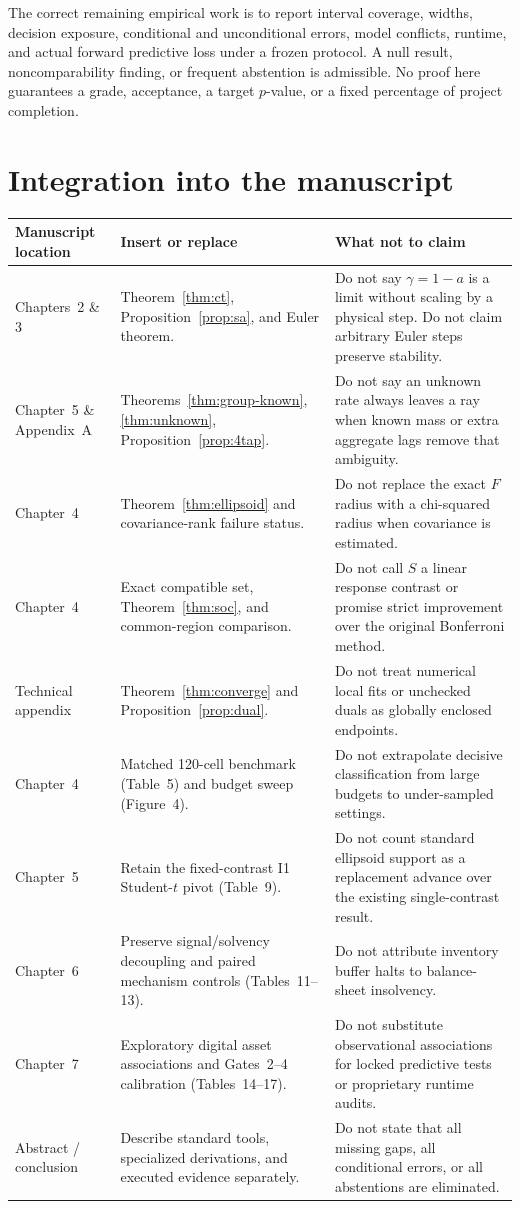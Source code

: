 \documentclass[11pt,a4paper]{article}
\theoremstyle{definition}\newtheorem{definition}[theorem]{Definition}
\theoremstyle{remark}\newtheorem{remark}[theorem]{Remark}
\begin{document}
The correct remaining empirical work is to report interval coverage, widths, decision exposure, conditional and unconditional errors, model conflicts, runtime, and actual forward predictive loss under a frozen protocol. A null result, noncomparability finding, or frequent abstention is admissible. No proof here guarantees a grade, acceptance, a target $p$-value, or a fixed percentage of project completion.

\section{Integration into the manuscript}
\begin{longtable}{P{.20\textwidth}P{.34\textwidth}P{.38\textwidth}}
\toprule
Manuscript location & Insert or replace & What not to claim\\\midrule
Chapters~2 \& 3 & Theorem~\ref{thm:ct}, Proposition~\ref{prop:sa}, and Euler theorem. & Do not say $\gamma=1-a$ is a limit without scaling by a physical step. Do not claim arbitrary Euler steps preserve stability.\\
Chapter~5 \& Appendix~A & Theorems~\ref{thm:group-known}, \ref{thm:unknown}, Proposition~\ref{prop:4tap}. & Do not say an unknown rate always leaves a ray when known mass or extra aggregate lags remove that ambiguity.\\
Chapter~4 & Theorem~\ref{thm:ellipsoid} and covariance-rank failure status. & Do not replace the exact $F$ radius with a chi-squared radius when covariance is estimated.\\
Chapter~4 & Exact compatible set, Theorem~\ref{thm:soc}, and common-region comparison. & Do not call $S$ a linear response contrast or promise strict improvement over the original Bonferroni method.\\
Technical appendix & Theorem~\ref{thm:converge} and Proposition~\ref{prop:dual}. & Do not treat numerical local fits or unchecked duals as globally enclosed endpoints.\\
Chapter~4 & Matched 120-cell benchmark (Table~5) and budget sweep (Figure~4). & Do not extrapolate decisive classification from large budgets to under-sampled settings.\\
Chapter~5 & Retain the fixed-contrast I1 Student-$t$ pivot (Table~9). & Do not count standard ellipsoid support as a replacement advance over the existing single-contrast result.\\
Chapter~6 & Preserve signal/solvency decoupling and paired mechanism controls (Tables~11--13). & Do not attribute inventory buffer halts to balance-sheet insolvency.\\
Chapter~7 & Exploratory digital asset associations and Gates~2--4 calibration (Tables~14--17). & Do not substitute observational associations for locked predictive tests or proprietary runtime audits.\\
Abstract / conclusion & Describe standard tools, specialized derivations, and executed evidence separately. & Do not state that all missing gaps, all conditional errors, or all abstentions are eliminated.\\\bottomrule
\end{longtable}
\end{document}
